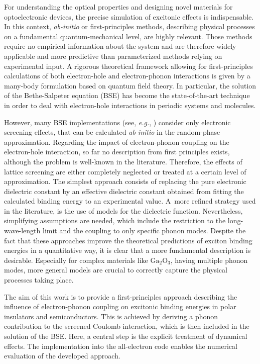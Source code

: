 For understanding the optical properties and designing novel materials for optoelectronic devices, the precise simulation of excitonic effects is indispensable. In this context, \textit{ab-initio} or first-principles methods, describing physical processes on a fundamental quantum-mechanical level, are highly relevant. Those methods require no empirical information about the system and are therefore widely applicable and more predictive than parameterized methods relying on experimental input. A rigorous theoretical framework allowing for first-principles calculations of both electron-hole and electron-phonon interactions is given by a many-body formulation based on quantum field theory. In particular, the solution of the Bethe-Salpeter equation (BSE) has become the state-of-the-art technique in order to deal with electron-hole interactions in periodic systems and molecules\cite{strinati1988application,rohlf_louie_2000}.\par 
However, many BSE implementations (see, \textit
{e.g.}, \cite{Vorwerk_2019,simple_x}) consider only electronic screening effects, that can be calculated \textit{ab initio} in the random-phase approximation\cite{random_phase}. Regarding the impact of electron-phonon coupling on the electron-hole interaction, so far no description from first principles exists, although the problem is well-known in the literature\cite{bechstedt2016many,cardona2005fundamentals}. Therefore, the effects of lattice screening are either completely neglected or treated at a certain level of approximation. The simplest approach consists of replacing the pure electronic dielectric constant  by an effective dielectric constant obtained from fitting the calculated binding energy to an experimental value\cite{fuchs_08}. A~more refined strategy used in the literature, is the use of models for the dielectric function. Nevertheless,  simplifying assumptions are needed, which include the restriction to the long-wave-length limit and  the coupling to  only specific phonon modes\cite{highly_ionic,Bechstedt}. Despite the fact that these approaches improve the theoretical predictions of exciton binding energies in a quantitative way, it is clear that a more fundamental description is desirable. Especially for complex materials like  $\text{Ga}_2\text{O}_3$, having multiple phonon modes, more general models are crucial to correctly capture the physical processes taking place.\par
The aim of this work is to provide a first-principles approach describing the influence of electron-phonon coupling on excitonic binding energies in polar insulators and semiconductors. This is achieved by deriving a phonon contribution to the screened Coulomb interaction, which is  then included in the solution of the BSE. Here, a central step is the explicit treatment of dynamical effects. The implementation into the all-electron code \exciting{}\cite{exciting} enables the numerical evaluation of the developed approach.\par
